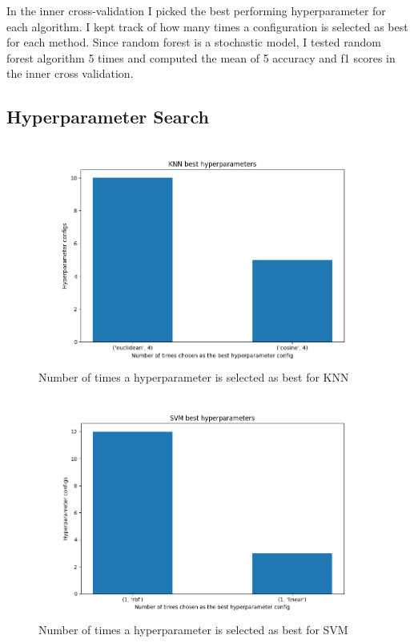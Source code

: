 \documentclass[12pt,a4paper, margin=1in]{article}
\begin{document}
In the inner cross-validation I picked the best performing hyperparameter for each algorithm. I kept track of how many times a configuration is selected as best for each method.
Since random forest is a stochastic model, I tested random forest algorithm 5 times and computed the mean of 5 accuracy and f1 scores in the inner cross validation.

\subsection{Hyperparameter Search}

\begin{figure}[H]
    \centering
    \includegraphics[scale=0.75]{knn-hypr.png}
    \caption{Number of times a hyperparameter is selected as best for KNN}
\end{figure}

\begin{figure}[H]
    \centering
    \includegraphics[scale=0.75]{svm-hypr.png}
    \caption{Number of times a hyperparameter is selected as best for SVM}
\end{figure}
\end{document}
